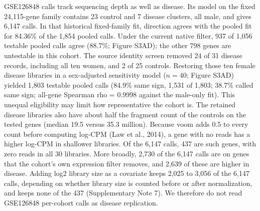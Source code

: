 GSE126848 calls track sequencing depth as well as disease. Its model on the fixed 24,115-gene family contains 23 control and 7 disease clusters, all male, and gives 6,147 calls. In that historical fixed-family fit, direction agrees with the pooled fit for 84.36\% of the 1,854 pooled calls. Under the current native filter, 937 of 1,056 testable pooled calls agree (88.7\%; Figure S3AD); the other 798 genes are untestable in this cohort. The source identity screen removed 24 of 31 disease records, including all ten women, and 2 of 25 controls. Restoring those ten female disease libraries in a sex-adjusted sensitivity model ($n = 40$; Figure S3AD) yielded 1,803 testable pooled calls (84.9\% same sign, 1,531 of 1,803; 38.7\% called same sign; all-gene Spearman rho = 0.9998 against the male-only fit). This unequal eligibility may limit how representative the cohort is. The retained disease libraries also have about half the fragment count of the controls on the tested genes (median 19.5 versus 35.3 million). Because voom adds 0.5 to every count before computing log-CPM (Law et al., 2014), a gene with no reads has a higher log-CPM in shallower libraries. Of the 6,147 calls, 437 are such genes, with zero reads in all 30 libraries. More broadly, 2,730 of the 6,147 calls are on genes that the cohort's own expression filter removes, and 2,639 of these are higher in disease. Adding log2 library size as a covariate keeps 2,025 to 3,056 of the 6,147 calls, depending on whether library size is counted before or after normalization, and keeps none of the 437 (Supplementary Note 7). We therefore do not read GSE126848 per-cohort calls as disease replication.

